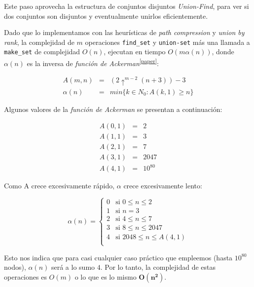 Este paso aprovecha la estructura de conjuntos disjuntos \textit{Union-Find}, para ver si dos conjuntos son disjuntos y eventualmente unirlos eficientemente. 

\newpage

Dado que lo implementamos con las heur\'isticas de \textit{path compression} y \textit{union by rank}, la complejidad de $m$ operaciones \texttt{find_set} y \texttt{union-set} m\'as una llamada a \texttt{make_set} de complejidad $O(n)$, ejecutan en tiempo $O(m\alpha(n))$, donde $\alpha(n)$ es la inversa de\emph{ funci\'on de Ackerman}\textsuperscript{\ref{paper}}:

\begin{equation*}
\begin{array}{lll}
A(m,n) & = & (2\uparrow^{m-2}(n+3))-3 \\
\alpha(n) & = & min\{k \in N_0 : A(k,1) \geq n\}
\end{array}
\end{equation*}

	Algunos valores de la \emph{funci\'on de Ackerman} se presentan a continuaci\'on:

\begin{equation*}
\begin{array}{lll}
A(0,1) & = & 2 \\
A(1,1) & = & 3 \\
A(2,1) & = & 7 \\
A(3,1) & = & 2047 \\
A(4,1) & = & 10^{80}
\end{array}
\end{equation*}

	Como A crece excesivamente r\'apido, $\alpha$ crece excesivamente lento:

	\begin{equation*}
	\alpha(n) = 
	\begin{cases} 
		0  & \mbox{si } 0 \leq n \leq 2 \\
		1  & \mbox{si } n = 3 \\
		2  & \mbox{si } 4 \leq n \leq 7 \\
		3  & \mbox{si } 8 \leq n \leq 2047 \\
		4  & \mbox{si } 2048 \leq n \leq A(4,1) \\
	\end{cases}
	\end{equation*}

	Esto nos indica que para casi cualquier caso pr\'actico que empleemos (hasta $10^{80}$ nodos), $\alpha(n)$ ser\'a a lo sumo $4$. Por lo tanto, la complejidad de estas operaciones es $O(m)$ o lo que es lo mismo $\mathbf{O(n^2)}$.
	
